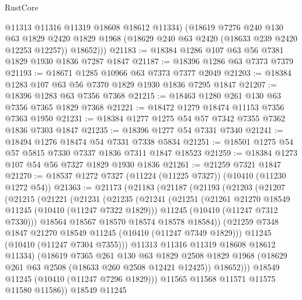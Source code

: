 \begin{lexlean}{RustCore}
\begin{coremodule}
          @11313
          @11316
          @11319
          @18608
          @18612
          @11334)
        (@18619
          @7276
          @240
          @130
          @63
          @1829
          @2420
          @1829
          @1968
          (@18629 @240 @63 @2420 (@18633 @239 @2420 @12253 @12257))
          @18652)))
@21183 := @18384 @1286 @107 @63 @56 @7381 @1829 @1930 @1836 @7287 @1847
@21187 := @18396 @1286 @63 @7373 @7379
@21193 := @18671 @1285 @10966 @63 @7373 @7377 @2049
@21203 := @18384 @1283 @107 @63 @56 @7370 @1829 @1930 @1836 @7295 @1847
@21207 := @18396 @1283 @63 @7356 @7368
@21215 := @18463 @1280 @261 @130 @63 @7356 @7365 @1829 @7368
@21221 := @18472 @1279 @18474 @11153 @7356 @7363 @1950
@21231 := @18384 @1277 @1275 @54 @57 @7342 @7355 @7362 @1836 @7303 @1847
@21235 := @18396 @1277 @54 @7331 @7340
@21241 := @18494 @1276 @18474 @54 @7331 @7338 @5834
@21251 := @18501 @1275 @54 @57 @5815 @7330 @7337 @1836 @7311 @1847 @18523
@21259 := @18384 @1273 @107 @54 @56 @7327 @1829 @1930 @1836
@21261 := @21259 @7321 @1847
@21270 := @18537 @1272 @7327 (@11224 (@11225 @7327)) (@10410 (@11230 @1272 @54))
@21363 := @21173
    (@21183
      (@21187
        (@21193
          (@21203
            (@21207
              (@21215
                (@21221
                  (@21231
                    (@21235
                      (@21241
                        (@21251
                          (@21261 @21270 @18549 @11245 (@10410 (@11247 @7322 @1829)))
                          @11245
                          (@10410 (@11247 @7312 @7330)))
                        @18564
                        @18567
                        @18570
                        @18574
                        @18578
                        @18584))
                    (@21259 @7348 @1847 @21270 @18549 @11245 (@10410 (@11247 @7349 @1829)))
                    @11245
                    (@10410 (@11247 @7304 @7355)))
                  @11313
                  @11316
                  @11319
                  @18608
                  @18612
                  @11334)
                (@18619
                  @7365
                  @261
                  @130
                  @63
                  @1829
                  @2508
                  @1829
                  @1968
                  (@18629 @261 @63 @2508 (@18633 @260 @2508 @12421 @12425))
                  @18652)))
            @18549
            @11245
            (@10410 (@11247 @7296 @1829)))
          @11565
          @11568
          @11571
          @11575
          @11580
          @11586))
      @18549
      @11245

\end{coremodule}
\end{lexlean}
